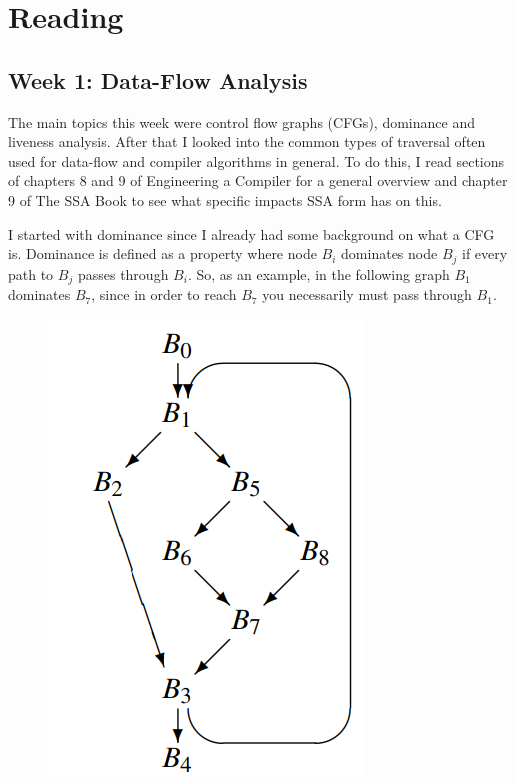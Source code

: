 \documentclass[11pt, a4paper, titlepage]{article}
\begin{document}
\pagebreak
\section{Reading}

\subsection{Week 1: Data-Flow Analysis}

The main topics this week were control flow graphs (CFGs), dominance and liveness analysis. After that I looked into the common types of traversal often used for data-flow and compiler algorithms in general. To do this, I read sections of chapters 8 and 9 of Engineering a Compiler for a general overview and chapter 9 of The SSA Book to see what specific impacts SSA form has on this.

I started with dominance since I already had some background on what a CFG is.
Dominance is defined as a property where node $B_{i}$ dominates node $B_{j}$ if every path to $B_{j}$ passes through $B_{i}$.
So, as an example, in the following graph $B_{1}$ dominates $B_{7}$, since in order to reach $B_{7}$ you necessarily must pass through $B_{1}$.

\begin{figure}[H]
  \centering
  \includegraphics[scale=0.3]{images/r1.png}
\end{figure}
\end{document}
